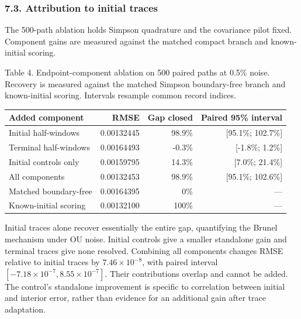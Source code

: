 \documentclass[
  american,
  11pt,
]{article}
\newcounter{none} %
\begin{document}
\subsubsection{7.3. Attribution to initial
traces}\label{attribution-to-initial-traces}

The 500-path ablation holds Simpson quadrature and the covariance pilot
fixed. Component gains are measured against the matched compact branch
and known-initial scoring.

\begin{center}
\begin{minipage}{\linewidth}
Table 4. Endpoint-component ablation on 500 paired paths at 0.5\% noise.
Recovery is measured against the matched Simpson boundary-free branch
and known-initial scoring. Intervals resample common record indices.

\small\setlength{\tabcolsep}{3pt}
\begin{tabular}{@{}lrrr@{}}
\toprule\noalign{}
Added component & RMSE & Gap closed & Paired 95\% interval \\
\midrule\noalign{}
Initial half-windows & 0.00132445 & 98.9\% & {[}95.1\%; 102.7\%{]} \\
Terminal half-windows & 0.00164493 & -0.3\% & {[}-1.8\%; 1.2\%{]} \\
Initial controls only & 0.00159795 & 14.3\% & {[}7.0\%; 21.4\%{]} \\
All components & 0.00132453 & 98.9\% & {[}95.1\%; 102.6\%{]} \\
Matched boundary-free & 0.00164395 & 0\% & --- \\
Known-initial scoring & 0.00132100 & 100\% & --- \\
\bottomrule
\end{tabular}
\end{minipage}
\end{center}

Initial traces alone recover essentially the entire gap, quantifying the
Brunel mechanism under OU noise. Initial controls give a smaller
standalone gain and terminal traces give none resolved. Combining all
components changes RMSE relative to initial traces by
\(7.46\times10^{-8}\), with paired interval
\([-7.18\times10^{-7},8.55\times10^{-7}]\). Their contributions overlap
and cannot be added. The control's standalone improvement is specific to
correlation between initial and interior error, rather than evidence for
an additional gain after trace adaptation.
\end{document}
